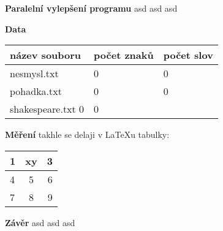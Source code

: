 \documentclass{article}
\begin{document}
\textbf{Paralelní vylepšení programu}
\newline
asd asd asd
\newline

\textbf{Data}
\newline
\begin{tabular}{ l | l | l }
  \textbf{název souboru} & počet znaků & počet slov \\
  \hline
  nesmysl.txt & 0 & 0 \\
  pohadka.txt & 0 & 0 \\
  shakespeare.txt 0 & 0 \\
  \hline
\end{tabular}
\newline

\textbf{Měření}
\newline
takhle se delaji v \LaTeX u tabulky:
\begin{tabular}{ l | c | r }
  \hline			
  1 & \textbf{xy} & 3 \\
  \hline
  \hline
  4 & 5 & 6 \\
  7 & 8 & 9 \\
  \hline
\end{tabular}

\textbf{Závěr}
\newline
asd asd asd
\newline
\end{document}
